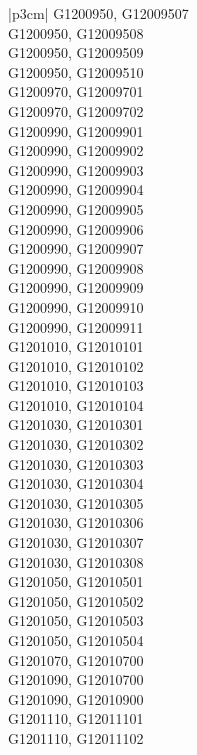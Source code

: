 \begin{customLongTable}{ |p{3cm}| }
G1200950, G12009507 \\ \hline
G1200950, G12009508 \\ \hline
G1200950, G12009509 \\ \hline
G1200950, G12009510 \\ \hline
G1200970, G12009701 \\ \hline
G1200970, G12009702 \\ \hline
G1200990, G12009901 \\ \hline
G1200990, G12009902 \\ \hline
G1200990, G12009903 \\ \hline
G1200990, G12009904 \\ \hline
G1200990, G12009905 \\ \hline
G1200990, G12009906 \\ \hline
G1200990, G12009907 \\ \hline
G1200990, G12009908 \\ \hline
G1200990, G12009909 \\ \hline
G1200990, G12009910 \\ \hline
G1200990, G12009911 \\ \hline
G1201010, G12010101 \\ \hline
G1201010, G12010102 \\ \hline
G1201010, G12010103 \\ \hline
G1201010, G12010104 \\ \hline
G1201030, G12010301 \\ \hline
G1201030, G12010302 \\ \hline
G1201030, G12010303 \\ \hline
G1201030, G12010304 \\ \hline
G1201030, G12010305 \\ \hline
G1201030, G12010306 \\ \hline
G1201030, G12010307 \\ \hline
G1201030, G12010308 \\ \hline
G1201050, G12010501 \\ \hline
G1201050, G12010502 \\ \hline
G1201050, G12010503 \\ \hline
G1201050, G12010504 \\ \hline
G1201070, G12010700 \\ \hline
G1201090, G12010700 \\ \hline
G1201090, G12010900 \\ \hline
G1201110, G12011101 \\ \hline
G1201110, G12011102 \\ \hline

\end{customLongTable}
